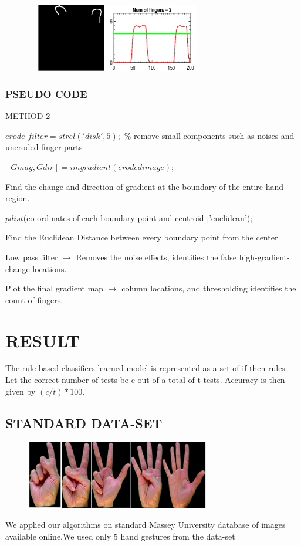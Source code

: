 \documentclass[conference]{IEEEtran}
\begin{document}
\begin{figure}[h!]
	\centering
	\includegraphics[width = 8cm, height = 3cm]{fin2m2}
\end{figure}

\subsubsection{PSEUDO CODE}
METHOD 2

$erode\_filter= strel('disk',5);$ \% remove small components such as noises and uneroded finger parts
 
$[Gmag, Gdir] = imgradient(eroded image); $

Find the change and direction of gradient at the boundary of the entire hand region. 

$pdist$(co-ordinates of each boundary point and centroid ,'euclidean');

Find the Euclidean Distance between every boundary point from the center.

Low pass filter $\rightarrow$ Removes the noise effects, identifies the false high-gradient-change locations.

Plot the final gradient map $\rightarrow$ column locations, and thresholding identifies the count of fingers.

\section{RESULT}
The rule-based classifiers learned model is represented as a set of if-then rules. Let the correct number of tests be c out of a total of t tests.
Accuracy is then given by $(c/t)*100$.

\subsection{STANDARD DATA-SET}
\begin{figure}[h!]
	\centering
	\includegraphics[width = 8cm, height = 3cm]{StandardDataset1}
\end{figure}
We applied our algorithms on standard Massey University database \cite{barczak2011new} of images available online.We used only 5 hand gestures from the data-set
\end{document}
